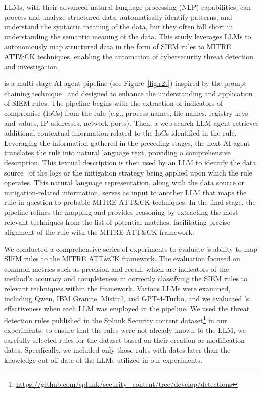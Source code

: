 LLMs, with their advanced natural language processing (NLP) capabilities, can process and analyze structured data, automatically identify patterns, and understand the syntactic meaning of the data, but they often fall short in understanding the semantic meaning of the data.
This study leverages LLMs to autonomously map structured data in the form of SIEM rules %
to MITRE ATT\&CK techniques, enabling the automation of cybersecurity threat detection and investigation.

\methodName is a multi-stage AI agent pipeline (see Figure~\ref{fig:r2t}) inspired by the prompt chaining technique~\cite{wu2022promptchainer} and designed to enhance the understanding and application of SIEM rules. 
The pipeline begins with the extraction of indicators of compromise (IoCs) from the rule (e.g., process names, file names, registry keys and values, IP addresses, network ports).
Then, a web search LLM agent retrieves additional contextual information related to the IoCs identified in the rule. 
Leveraging the information gathered in the preceding stages, the next AI agent translates the rule into natural language text, providing a comprehensive description.
This textual description is then used by an LLM to identify the data source~\cite{ds} of the logs or the mitigation strategy being applied upon which the rule operates.
This natural language representation, along with the data source or mitigation-related information, serves as input to another LLM that maps the rule in question to probable MITRE ATT\&CK techniques. 
In the final stage, the pipeline refines the mapping and provides reasoning by extracting the most relevant techniques from the list of potential matches, facilitating precise alignment of the rule with the MITRE ATT\&CK framework.

We conducted a comprehensive series of experiments to evaluate \methodName's ability to map SIEM rules to the MITRE ATT\&CK framework. 
The evaluation focused on common metrics such as precision and recall, which are indicators of the method's accuracy and completeness in correctly classifying the SIEM rules to relevant techniques within the framework.
Various LLMs were examined, including Qwen, IBM Granite, Mistral, and GPT-4-Turbo, and we evaluated \methodName's effectiveness when each LLM was employed in the pipeline.
We used the threat detection rules published in the Splunk Security content dataset\footnote{\url{https://github.com/splunk/security_content/tree/develop/detections}} in our experiments; to ensure that the rules were not already known to the LLM, we carefully selected rules for the dataset based on their creation or modification dates. 
Specifically, we included only those rules with dates later than the knowledge cut-off date of the LLMs utilized in our experiments. 



